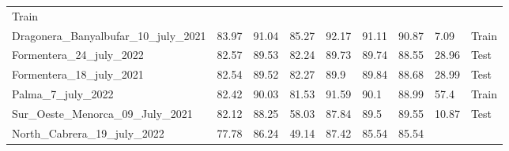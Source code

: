 \begin{table}[H]
{\begin{tabular}{lllllllll}
            {\color[HTML]{66c2a5} Train}
            \\
            Dragonera\_Banyalbufar\_10\_july\_2021 & 83.97               &
            91.04
                                                   & 85.27               &
            92.17
                                                   & 91.11               &
            90.87
                                                   & 7.09                &
            {\color[HTML]{66c2a5} Train}
            \\
            Formentera\_24\_july\_2022             & 82.57               &
            89.53
                                                   & 82.24               &
            89.73
                                                   & 89.74               &
            88.55
                                                   & 28.96               &
            {\color[HTML]{fc8d62} Test}
            \\
            Formentera\_18\_july\_2021             & 82.54               &
            89.52
                                                   & 82.27               & 89.9
                                                   & 89.84               &
            88.68
                                                   & 28.99               &
            {\color[HTML]{fc8d62} Test}
            \\
            Palma\_7\_july\_2022                   & 82.42               &
            90.03
                                                   & 81.53               &
            91.59
                                                   & 90.1                &
            88.99
                                                   & 57.4                &
            {\color[HTML]{66c2a5} Train}
            \\
            Sur\_Oeste\_Menorca\_09\_July\_2021    & 82.12               &
            88.25
                                                   & 58.03               &
            87.84
                                                   & 89.5                &
            89.55
                                                   & 10.87               &
            {\color[HTML]{fc8d62} Test}
            \\
            North\_Cabrera\_19\_july\_2022         & 77.78               &
            86.24
                                                   & 49.14               &
            87.42
                                                   & 85.54               &
            85.54

\end{tabular}}
\end{table}
